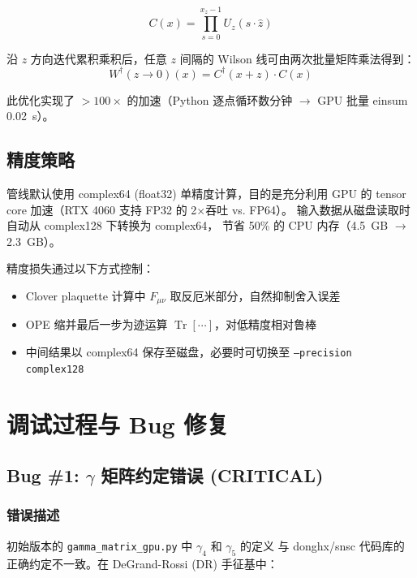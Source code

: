 \documentclass[11pt,a4paper]{article}
\begin{document}
\begin{equation}\label{eq:cum_trans}
  C(x) = \prod_{s=0}^{x_z-1} U_z(s\cdot\hat{z})
\end{equation}

沿 $z$ 方向迭代累积乘积后，任意 $z$ 间隔的 Wilson 线可由两次批量矩阵乘法得到：
\begin{equation}\label{eq:wilson_fast}
  W^{\dag}(z \to 0)(x) = C^{\dag}(x+z) \cdot C(x)
\end{equation}

此优化实现了 $>100\times$ 的加速（Python 逐点循环数分钟 $\to$ GPU 批量 einsum 0.02~s）。

\subsection{精度策略}

管线默认使用 complex64 (float32) 单精度计算，目的是充分利用 GPU 的
tensor core 加速（RTX 4060 支持 FP32 的 2$\times$吞吐 vs. FP64）。
输入数据从磁盘读取时自动从 complex128 下转换为 complex64，
节省 50\% 的 CPU 内存（4.5~GB $\to$ 2.3~GB）。

精度损失通过以下方式控制：
\begin{itemize}
  \item Clover plaquette 计算中 $F_{\mu\nu}$ 取反厄米部分，自然抑制舍入误差
  \item OPE 缩并最后一步为迹运算 $\operatorname{Tr}[\cdots]$，对低精度相对鲁棒
  \item 中间结果以 complex64 保存至磁盘，必要时可切换至 \texttt{--precision complex128}
\end{itemize}

\section{调试过程与 Bug 修复}

\subsection{Bug \#1: $\gamma$ 矩阵约定错误 (CRITICAL)}

\subsubsection*{错误描述}

初始版本的 \texttt{gamma\_matrix\_gpu.py} 中 $\gamma_4$ 和 $\gamma_5$ 的定义
与 donghx/snsc 代码库的正确约定不一致。在 DeGrand-Rossi (DR) 手征基中：
\end{document}
